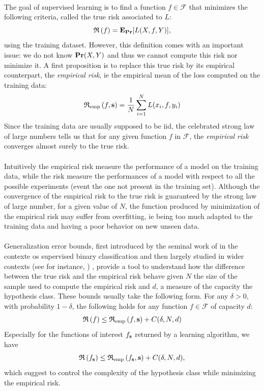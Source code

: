 \paragraph{}
The goal of supervised learning is to find a function $f \in \mathcal{F}$ that
minimizes the following criteria, called the true risk associated to $L$:
\begin{equation}\label{eq:true-risk}
    \mathfrak{R}\left(f\right)={\mathbf{{E}}}_{{\mathbf{{Pr}}}}[L(X,f,Y)],
\end{equation}
using the training dataset. However, this definition comes with an important
issue: we do not know ${\mathbf{{Pr}}}(X,Y)$ and thus we cannot compute this risk
nor minimize it.  A first proposition is to replace this true risk by its
empirical counterpart, the \emph{empirical risk}, \acs{ie} the empirical mean
of the loss computed on the training data:
\begin{dmath*}
    \riskemp{f, \seq{s}} = \frac{1}{N}\sum_{i=1}^N L(x_i, f, y_i)
\end{dmath*}
Since the training data are usually supposed to be \acs{iid}, the celebrated
strong law of large numbers tells us that for any given function $f$ in
$\mathcal{F}$, the \emph{empirical risk} converges almost surely to the true
risk.
\paragraph{}
Intuitively the empirical risk measure the performance of a model on the
training data, while the risk measure the performances of a model with respect
to all the possible experiments (event the one not present in the training
set). Although the convergence of the empirical risk to the true risk is
guaranteed by the strong law of large number, for a given value of $N$, the
function produced by minimization of the empirical risk may suffer from
overfitting, \acs{ie} being too much adapted to the training data and having a
poor behavior on new unseen data.
\paragraph{}
Generalization error bounds, first introduced by the seminal work of
\citet{vapnik1992principles} in the contexte os supervised binary
classification and then largely studied in wider contexts (see for instance,
\citet{Mohri2012}) , provide a tool to understand how the difference between the
true risk and the empirical risk behave given $N$ the size of the sample used
to compute the empirical risk and $d$, a measure of the capacity the hypothesis
class. These bounds usually take the following form. For any $\delta > 0$, with
probability $1 - \delta$, the following holds for any function $f \in
\mathcal{F}$ of
capacity $d$:
\begin{dmath*}
    \risk{f} \le \riskemp{f,\seq{s}} + C(\delta, N,d)
\end{dmath*}
Especially for the functions of interest $f_{\boldsymbol{\mathbf{s}}}$ returned by a learning
algorithm, we have 
\begin{dmath*}
    \risk{f_{\seq{s}}} \le \riskemp{f_{\seq{s}},\seq{s}} + C(\delta, N,d), 
\end{dmath*}
which suggest to control the complexity of the hypothesis class while
minimizing the empirical risk.
